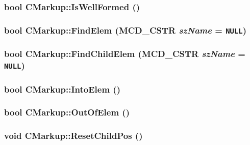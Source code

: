 \subsubsection[IsWellFormed]{\setlength{\rightskip}{0pt plus 5cm}bool CMarkup::IsWellFormed ()}\label{classCMarkup_f3a54e13b8565c2789c2c80aa2c9a563}


\subsubsection[FindElem]{\setlength{\rightskip}{0pt plus 5cm}bool CMarkup::FindElem ({\bf MCD\_\-CSTR} {\em szName} = {\tt NULL})}\label{classCMarkup_dc3e9cb6eb579afdf10bef7e91da746a}


\subsubsection[FindChildElem]{\setlength{\rightskip}{0pt plus 5cm}bool CMarkup::FindChildElem ({\bf MCD\_\-CSTR} {\em szName} = {\tt NULL})}\label{classCMarkup_8a882f72c9b206ed833c45ca9376e3d8}


\subsubsection[IntoElem]{\setlength{\rightskip}{0pt plus 5cm}bool CMarkup::IntoElem ()}\label{classCMarkup_e6136fa65e4f1927fe763d011d3eb9a3}


\subsubsection[OutOfElem]{\setlength{\rightskip}{0pt plus 5cm}bool CMarkup::OutOfElem ()}\label{classCMarkup_012bca9ceaf157033a5697fa6ea92e45}


\subsubsection[ResetChildPos]{\setlength{\rightskip}{0pt plus 5cm}void CMarkup::ResetChildPos ()\hspace{0.3cm}{\tt  [inline]}}\label{classCMarkup_b7c6cb57c9cca484ed7b1d741c5d37ee}




